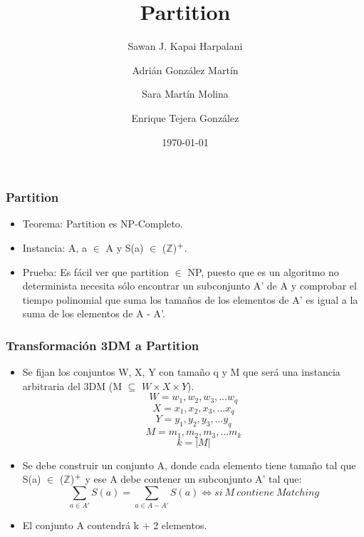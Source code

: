 \documentclass{beamer}
\title[ PARTITION ]{ Partition }
\author{Sawan J. Kapai Harpalani \and
Adri\'an Gonz\'alez Mart\'in \and
Sara Mart\'in Molina \and
Enrique Tejera Gonz\'alez
}
\institute[ULL] 
{
Universidad de La Laguna \ 
\medskip
}
\date{\today}
\begin{document}
\begin{frame}

\titlepage

\end{frame}


\begin{frame}
\frametitle{Partition}
\begin{itemize}
\item Teorema: Partition es NP-Completo.
\item Instancia: A, a $\in$ A y S(a) $\in$ ($\mathbb{Z}$)$\textsuperscript{+}$.
\item Prueba: Es f\'acil ver que partition $\in$ NP, puesto que es un algoritmo
no determinista necesita s\'olo encontrar un subconjunto A' de A y comprobar el
tiempo polinomial que suma los tama\~{n}os de los elementos de A' es igual a la
suma de los elementos de A - A'.

\end{itemize}

\end{frame}


\begin{frame}
\frametitle{Transformaci\'on 3DM a Partition}
\begin{itemize}
\item Se fijan los conjuntos W, X, Y con tama\~{n}o q y M que ser\'a una
instancia arbitraria del 3DM (M $\subseteq$ $W \times X \times Y$).
$$W = w_{1}, w_{2}, w_{3}, \ldots w_{q}$$
$$X = x_{1}, x_{2}, x_{3}, \ldots x_{q}$$
$$Y = y_{1}, y_{2}, y_{3}, \ldots y_{q}$$
$$M = m_{1}, m_{2}, m_{3}, \ldots m_{k}$$ 
$$ k = |M|$$

\item Se debe construir un conjunto A, donde cada elemento tiene tama\~{n}o tal
que S(a) $\in$ ($\mathbb{Z}$)$\textsuperscript{+}$ y ese A debe contener un
subconjunto A' tal que:
$$\sum\limits_{a \in A'} S(a) = \sum\limits_{a \in A - A'} S(a) \iff si \ M \ contiene \ Matching$$
\item El conjunto A contendr\'a k + 2 elementos.
\end{itemize}
\end{frame}
\end{document}

